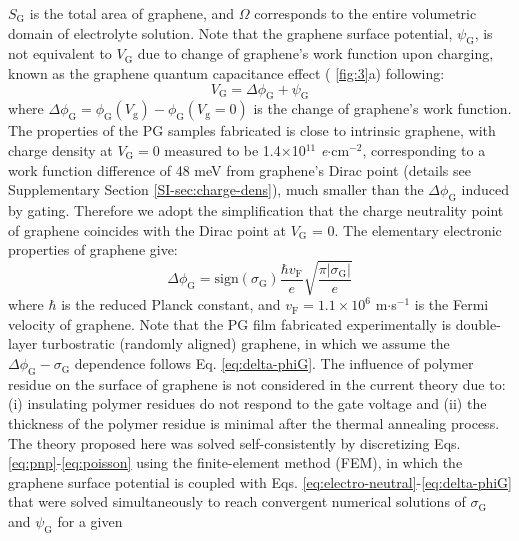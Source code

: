$S_{\mathrm{G}}$ is the total area of graphene, and $\Omega$
corresponds to the entire volumetric domain of electrolyte
solution. Note that the graphene surface potential,
$\psi_{\mathrm{G}}$, is not equivalent to $V_{\mathrm{G}}$ due to
change of graphene's work function upon charging, known as the
graphene quantum capacitance effect\cite{Xia_2009} (\Fig{}
\ref{fig:3}a) following:
\begin{equation}
  \label{eq:Vg}
  V_{\mathrm{G}} = \Delta \phi_{\mathrm{G}} + \psi_{\mathrm{G}}
\end{equation}
where
$\Delta \phi_{\mathrm{G}} = \phi_{\mathrm{G}}(V_{\mathrm{g}}) -
\phi_{\mathrm{G}}(V_{\mathrm{g}}=0)$ is the change of graphene’s work
function. The properties of the PG samples fabricated is close to
intrinsic graphene, with charge density at $V_{\mathrm{G}}=0$ measured
to be 1.4$\times$10$^{11}$ \textit{e}$\cdot$cm$^{-2}$, corresponding
to a work function difference of 48 meV from graphene's Dirac point
(details see Supplementary Section \ref{SI-sec:charge-dens}), much
smaller than the $\Delta \phi_{\mathrm{G}}$ induced by gating.
Therefore we adopt the simplification that the charge neutrality point
of graphene coincides with the Dirac point at $V_{\mathrm{G}}$ =
0. The elementary electronic properties of graphene give:
\begin{equation}
  \label{eq:delta-phiG}
  \Delta \phi_{\mathrm{G}} = \mathrm{sign}(\sigma_{\mathrm{G}}) \frac{\hbar v_{\mathrm{F}}}{e}
  \sqrt{\frac{\pi |\sigma_{\mathrm{G}}|}{e}}
\end{equation}
where $\hbar$ is the reduced Planck constant, and
$v_{\mathrm{F}}=1.1\times10^{6}$ m$\cdot$s$^{-1}$ is the Fermi
velocity of graphene.  Note that the PG film fabricated experimentally
is double-layer turbostratic (randomly aligned) graphene, in which we
assume the $\Delta \phi_{\mathrm{G}} - \sigma_{\mathrm{G}}$ dependence
follows Eq. \eqref{eq:delta-phiG}. The influence of polymer residue on
the surface of graphene is not considered in the current theory due
to: (i) insulating polymer residues do not respond to the gate voltage
and (ii) the thickness of the polymer residue is minimal after the
thermal annealing process. The theory proposed here was solved
self-consistently by discretizing
Eqs. \eqref{eq:pnp}-\eqref{eq:poisson} using the finite-element method
(FEM), in which the graphene surface potential is coupled with
Eqs. \eqref{eq:electro-neutral}-\eqref{eq:delta-phiG} that were solved
simultaneously to reach convergent numerical solutions of
$\sigma_{\mathrm{G}}$ and $\psi_{\mathrm{G}}$ for a given
